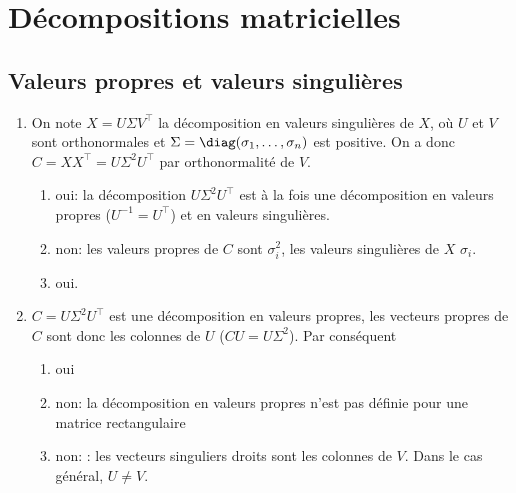 \documentclass{article}
\begin{document}
\begin{enumerate}
\begin{enumerate}
	
	
	\end{enumerate}
	
	\end{enumerate}
	
	
	\section{Décompositions matricielles}
	
	\subsection{Valeurs propres et valeurs singulières}
	
	\begin{enumerate}
		\item On note $X = U\Sigma V^\top$ la décomposition en valeurs singulières de $X$, où $U$ et $V$ sont orthonormales et $\Sigma = \diag(\sigma_1,\ldots,\sigma_n)$ est positive. On a donc $C = XX^\top = U \Sigma^2 U^\top$ par orthonormalité de $V$.
		\begin{enumerate}
			\item  oui: la décomposition $U \Sigma^2 U^\top$ est à la fois une décomposition en valeurs propres ($U^{-1} = U^\top$) et en valeurs singulières.
			\item non: les valeurs propres de $C$ sont $\sigma_i^2$, les valeurs singulières de $X$ $\sigma_i$.
			\item oui.
		\end{enumerate}
		
		\item $C = U\Sigma^2 U^\top$ est une décomposition en valeurs propres, les vecteurs propres de $C$ sont donc les colonnes de $U$ ($CU = U\Sigma^2$). Par conséquent
		\begin{enumerate}
			\item  oui
			
			\item non: la décomposition en valeurs propres n'est pas définie pour une matrice rectangulaire
			
			\item non: : les vecteurs singuliers droits sont les colonnes de $V$. Dans le cas général, $U \neq V$.
		\end{enumerate}
	\end{enumerate}
\end{document}
